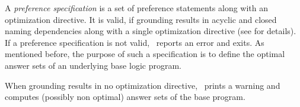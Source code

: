 A \emph{preference specification} is a set of preference statements along with an optimization directive.
It is valid, if grounding results in acyclic and closed naming dependencies
along with a single optimization directive
(see \cite{brderosc15a} for details).
If a preference specification is not valid, \asprin\ reports an error and exits.
%
As mentioned before,
the purpose of such a specification is to define the optimal answer sets of an underlying base logic program.
%
\begin{note}\label{asprin:noopt}
When grounding results in no optimization directive, 
\asprin\ prints a warning and computes (possibly non optimal) answer sets of the base program.
%
\end{note}

